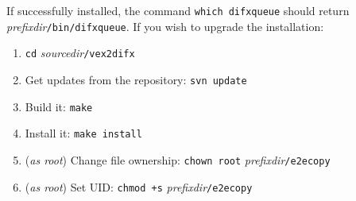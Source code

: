 If successfully installed, the command {\tt which difxqueue} should return {\em prefixdir}{\tt /bin/difxqueue}.
If you wish to upgrade the installation:
\begin{enumerate}
\item {\tt cd} {\em sourcedir}{\tt /vex2difx}
\item Get updates from the repository: {\tt svn update}
\item Build it: {\tt make}
\item Install it: {\tt make install}
\item ({\em as root}) Change file ownership: {\tt chown root} {\em prefixdir}{\tt /e2ecopy}
\item ({\em as root}) Set UID: {\tt chmod +s} {\em prefixdir}{\tt /e2ecopy}
\end{enumerate}
